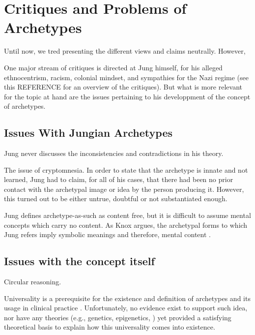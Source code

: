 \documentclass[
]{book}
\begin{document}
\hypertarget{critiques-and-problems-of-archetypes}{%
\section{Critiques and Problems of Archetypes}\label{critiques-and-problems-of-archetypes}}

Until now, we tred presenting the different views and claims neutrally. However,

One major stream of critiques is directed at Jung himself, for his alleged ethnocentrism, racism, colonial mindset, and sympathies for the Nazi regime (see this REFERENCE for an overview of the critiques). But what is more relevant for the topic at hand are the issues pertaining to his developpment of the concept of archetypes.

\hypertarget{issues-with-jungian-archetypes}{%
\subsection{Issues With Jungian Archetypes}\label{issues-with-jungian-archetypes}}

Jung never discusses the inconsistencies and contradictions in his theory.

The issue of cryptomnesia. In order to state that the archetype is innate and not learned, Jung had to claim, for all of his cases, that there had been no prior contact with the archetypal image or idea by the person producing it. However, this turned out to be either untrue, doubtful or not substantiated enough. \citep{roesler2012archetypes}

Jung defines archetype-as-such as content free, but it is difficult to assume mental concepts which carry no content. As Knox argues, the archetypal forms to which Jung refers imply symbolic meanings and therefore, mental content \citep[p.~33]{knox2003archetype}.

\hypertarget{issues-with-the-concept-itself}{%
\subsection{Issues with the concept itself}\label{issues-with-the-concept-itself}}

Circular reasoning.

Universality is a prerequisite for the existence and definition of archetypes and its usage in clinical practice \citep{roesler2012archetypes}. Unfortunately, no evidence exist to support such idea, nor have any theories (e.g., genetics, epigenetics, ) yet provided a satisfying theoretical basis to explain how this universality comes into existence.
\end{document}
